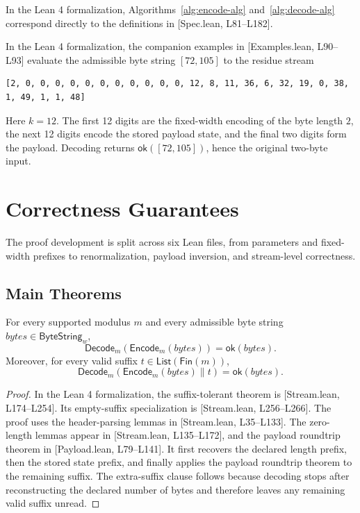 \documentclass{system-security-article}
\providecommand{\href}[2]{#2}
\newcommand{\ByteString}{\mathsf{ByteString}}
\newcommand{\ByteStringBounded}{\ByteString_{w}}
\newcommand{\EncodeM}{\mathsf{Encode}_m}
\newcommand{\DecodeM}{\mathsf{Decode}_m}
\newcommand{\List}{\mathsf{List}}
\newcommand{\Fin}{\mathsf{Fin}}
\newcommand{\OK}{\mathsf{ok}}
\newcommand{\concat}{\mathbin{\|}}
\newcommand{\BytesVar}{\mathit{bytes}}
\newcommand{\LeanSpec}[2]{\href{https://github.com/KyrylR/phd-symmetric-cryptography/blob/8e903222a7df1c4365592e4b16fa752a924b8977/lean/encoding-dr-1/EncodingProofs/BaseMLen/Spec.lean\#L#1-L#2}{[Spec.lean, L#1--L#2]}}
\newcommand{\LeanPayload}[2]{\href{https://github.com/KyrylR/phd-symmetric-cryptography/blob/8e903222a7df1c4365592e4b16fa752a924b8977/lean/encoding-dr-1/EncodingProofs/BaseMLen/Payload.lean\#L#1-L#2}{[Payload.lean, L#1--L#2]}}
\newcommand{\LeanStream}[2]{\href{https://github.com/KyrylR/phd-symmetric-cryptography/blob/8e903222a7df1c4365592e4b16fa752a924b8977/lean/encoding-dr-1/EncodingProofs/BaseMLen/Stream.lean\#L#1-L#2}{[Stream.lean, L#1--L#2]}}
\newcommand{\LeanExamples}[2]{\href{https://github.com/KyrylR/phd-symmetric-cryptography/blob/8e903222a7df1c4365592e4b16fa752a924b8977/lean/encoding-dr-1/EncodingProofs/BaseMLen/Examples.lean\#L#1-L#2}{[Examples.lean, L#1--L#2]}}
\begin{document}
    In the Lean 4 formalization, Algorithms~\ref{alg:encode-alg} and~\ref{alg:decode-alg} correspond directly to the definitions in \LeanSpec{81}{182}.

    \begin{example}[Worked example for ``Hi'' at \(m=50\) and \(w=64\)]
        In the Lean 4 formalization, the companion examples in \LeanExamples{90}{93} evaluate the admissible byte string \([72,105]\) to the residue stream
        \begin{lstlisting}[numbers=none,label={lst:lstlisting}]
[2, 0, 0, 0, 0, 0, 0, 0, 0, 0, 0, 0, 12, 8, 11, 36, 6, 32, 19, 0, 38, 1, 49, 1, 1, 48]
        \end{lstlisting}
        Here \(k = 12\).
        The first 12 digits are the fixed-width encoding of the byte length
        \(2\), the next 12 digits encode the stored payload state, and the final two digits form the payload.
        Decoding returns \(\OK([72,105])\), hence the original two-byte input.
    \end{example}

    \section{Correctness Guarantees}
    \label{sec:correctness}

    The proof development is split across six Lean files, from parameters and fixed-width prefixes to
    renormalization, payload inversion, and stream-level correctness.

    \subsection{Main Theorems}
    \label{subsec:main-theorems}

    \begin{theorem}
        \label{thm:stream-roundtrip}
        For every supported modulus \(m\) and every admissible byte string
        \(\BytesVar \in \ByteStringBounded\),
        \[
            \DecodeM(\EncodeM(\BytesVar)) = \OK(\BytesVar).
        \]
        Moreover, for every valid suffix \(t \in \List(\Fin(m))\),
        \[
            \DecodeM(\EncodeM(\BytesVar) \concat t) = \OK(\BytesVar).
        \]
    \end{theorem}

    \begin{proof}
        In the Lean 4 formalization, the suffix-tolerant theorem is \LeanStream{174}{254}.
        Its empty-suffix specialization is \LeanStream{256}{266}.
        The proof uses the header-parsing lemmas in \LeanStream{35}{133}.
        The zero-length lemmas appear in \LeanStream{135}{172}, and the payload roundtrip theorem in
        \LeanPayload{79}{141}.
        It first recovers the declared length prefix, then the stored state prefix, and finally applies the
        payload roundtrip theorem to the remaining suffix.
        The extra-suffix clause follows because decoding stops after reconstructing the declared number
        of bytes and therefore leaves any remaining valid suffix unread.
    \end{proof}
\end{document}
